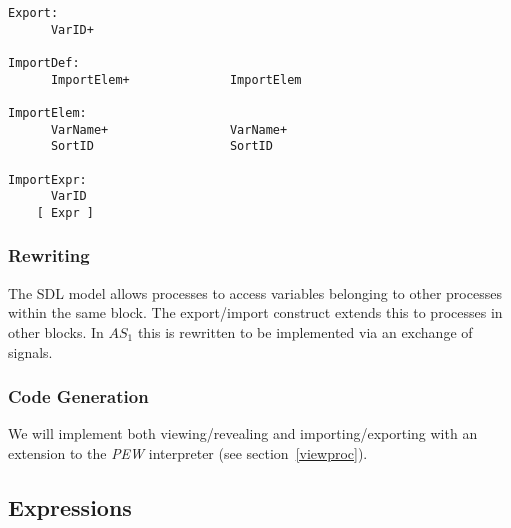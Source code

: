 \begin{verbatim}
Export:
      VarID+

ImportDef:
      ImportElem+              ImportElem

ImportElem:
      VarName+                 VarName+
      SortID                   SortID

ImportExpr:
      VarID
    [ Expr ]
\end{verbatim}

\subsubsection{Rewriting}

The SDL model allows processes to access variables belonging to
other processes within the same block. The export/import construct
extends this to processes in other blocks. In $AS_1$ this is
rewritten to be implemented via an exchange of signals.

\subsubsection{Code Generation}

We will implement both viewing/revealing and importing/exporting with
an extension to the {\em PEW} interpreter (see section~\ref{viewproc}).

\subsection{Expressions}

